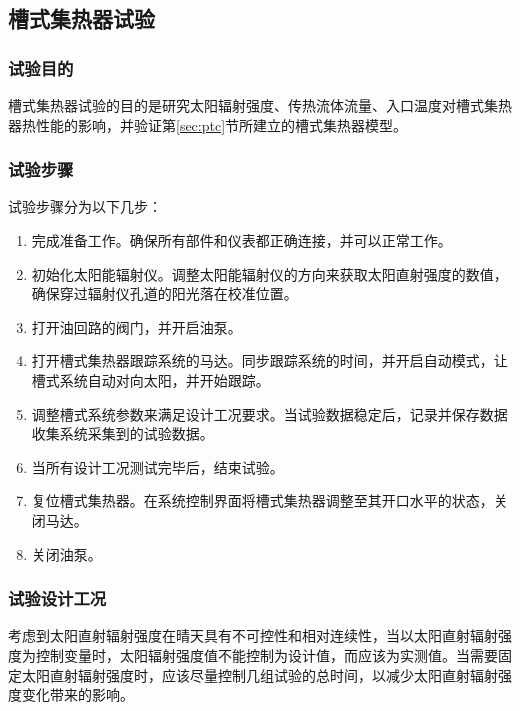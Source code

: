 \subsection{槽式集热器试验}
\subsubsection{试验目的}
槽式集热器试验的目的是研究太阳辐射强度、传热流体流量、入口温度对槽式集热器热性能的影响，并验证第\ref{sec:ptc}节所建立的槽式集热器模型。

\subsubsection{试验步骤}
试验步骤分为以下几步：
\begin{enumerate}[label=(\arabic*)]
	\item 完成准备工作。确保所有部件和仪表都正确连接，并可以正常工作。
	\item 初始化太阳能辐射仪。调整太阳能辐射仪的方向来获取太阳直射强度的数值，确保穿过辐射仪孔道的阳光落在校准位置。
	\item 打开油回路的阀门，并开启油泵。
	\item 打开槽式集热器跟踪系统的马达。同步跟踪系统的时间，并开启自动模式，让槽式系统自动对向太阳，并开始跟踪。
	\item 调整槽式系统参数来满足设计工况要求。当试验数据稳定后，记录并保存数据收集系统采集到的试验数据。
	\item 当所有设计工况测试完毕后，结束试验。
	\item 复位槽式集热器。在系统控制界面将槽式集热器调整至其开口水平的状态，关闭马达。
	\item 关闭油泵。
\end{enumerate}

\subsubsection{试验设计工况}

考虑到太阳直射辐射强度在晴天具有不可控性和相对连续性，当以太阳直射辐射强度为控制变量时，太阳辐射强度值不能控制为设计值，而应该为实测值。当需要固定太阳直射辐射强度时，应该尽量控制几组试验的总时间，以减少太阳直射辐射强度变化带来的影响。

